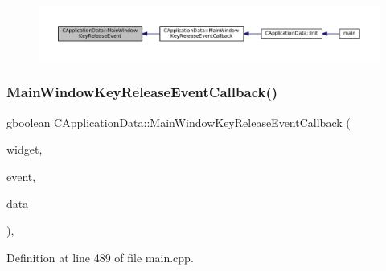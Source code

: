 \begin{figure}[H]
\begin{center}
\leavevmode
\includegraphics[width=350pt]{classCApplicationData_aff9f46bccd458a0dcca968e4a46c7d9b_icgraph}
\end{center}
\end{figure}
\hypertarget{classCApplicationData_a4b2c76db5c2efd75404502e36700f99b}{}\label{classCApplicationData_a4b2c76db5c2efd75404502e36700f99b} 
\subsubsection{\texorpdfstring{Main\+Window\+Key\+Release\+Event\+Callback()}{MainWindowKeyReleaseEventCallback()}}
{\footnotesize\ttfamily gboolean C\+Application\+Data\+::\+Main\+Window\+Key\+Release\+Event\+Callback (\begin{DoxyParamCaption}\item[{Gtk\+Widget $\ast$}]{widget,  }\item[{Gdk\+Event\+Key $\ast$}]{event,  }\item[{gpointer}]{data }\end{DoxyParamCaption})\hspace{0.3cm}{\ttfamily [static]}, {\ttfamily [protected]}}



Definition at line 489 of file main.\+cpp.


